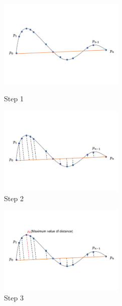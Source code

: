 \begin{figure}[h!]
\centering
\vspace{-1cm}
\setlength{\abovecaptionskip}{-1cm} 
\begin{minipage}[t]{0.48\textwidth}
\centering
\includegraphics[width=6cm]{03_images/sampling_1.pdf}
\caption{Step 1}
\label{fig:main:sampling1}
\end{minipage}
\begin{minipage}[t]{0.48\textwidth}
\centering
\includegraphics[width=6cm]{03_images/sampling_2.pdf}
\caption{Step 2}
\label{fig:main:sampling2}
\end{minipage}
\end{figure}
\begin{figure}[h!]
	\centering
        \vspace{-1.7cm}
        \setlength{\abovecaptionskip}{-1cm}
	\includegraphics[width=6cm]{03_images/sampling_3.pdf}
	\caption{Step 3}
	\label{fig:main:sampling3}
\end{figure}
